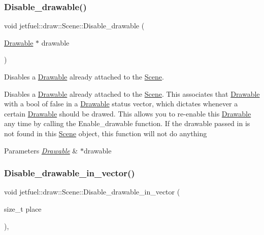 \subsubsection{\texorpdfstring{Disable\+\_\+drawable()}{Disable\_drawable()}}
{\footnotesize\ttfamily void jetfuel\+::draw\+::\+Scene\+::\+Disable\+\_\+drawable (\begin{DoxyParamCaption}\item[{\hyperlink{classjetfuel_1_1draw_1_1Drawable}{Drawable} $\ast$}]{drawable }\end{DoxyParamCaption})}



Disables a \hyperlink{classjetfuel_1_1draw_1_1Drawable}{Drawable} already attached to the \hyperlink{classjetfuel_1_1draw_1_1Scene}{Scene}. 

Disables a \hyperlink{classjetfuel_1_1draw_1_1Drawable}{Drawable} already attached to the \hyperlink{classjetfuel_1_1draw_1_1Scene}{Scene}. This associates that \hyperlink{classjetfuel_1_1draw_1_1Drawable}{Drawable} with a bool of false in a \hyperlink{classjetfuel_1_1draw_1_1Drawable}{Drawable} status vector, which dictates whenever a certain \hyperlink{classjetfuel_1_1draw_1_1Drawable}{Drawable} should be drawed. This allows you to re-\/enable this \hyperlink{classjetfuel_1_1draw_1_1Drawable}{Drawable} any time by calling the Enable\+\_\+drawable function. If the drawable passed in is not found in this \hyperlink{classjetfuel_1_1draw_1_1Scene}{Scene} object, this function will not do anything


\begin{DoxyParams}{Parameters}
{\em \hyperlink{classjetfuel_1_1draw_1_1Drawable}{Drawable}} & $\ast$drawable \\
\hline
\end{DoxyParams}
\mbox{\label{classjetfuel_1_1draw_1_1Scene_a725618dfecbdb201fba44be02cc2bc13}} 
\subsubsection{\texorpdfstring{Disable\+\_\+drawable\+\_\+in\+\_\+vector()}{Disable\_drawable\_in\_vector()}}
{\footnotesize\ttfamily void jetfuel\+::draw\+::\+Scene\+::\+Disable\+\_\+drawable\+\_\+in\+\_\+vector (\begin{DoxyParamCaption}\item[{size\+\_\+t}]{place }\end{DoxyParamCaption})\hspace{0.3cm}{\ttfamily [inline]}, {\ttfamily [protected]}}



